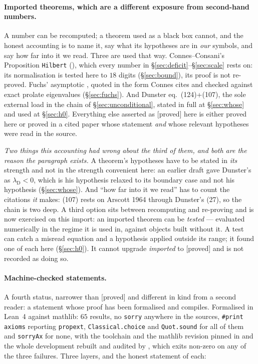 \documentclass[11pt,a4paper]{article}
\theoremstyle{plain}
\theoremstyle{definition}
\theoremstyle{remark}
\newcommand{\st}[1]{{\normalfont\sffamily\footnotesize[#1]}}
\newcommand{\proved}{\st{proved}}
\newcommand{\file}[1]{\path{#1}}
\begin{document}
\paragraph{Imported theorems, which are a different exposure from second-hand
numbers.}  A number can be recomputed; a theorem used as a black box cannot,
and the honest accounting is to name it, say what its hypotheses are in
\emph{our} symbols, and say how far into it we read.  Three are used that way.
Connes--Consani's Proposition \texttt{Hilbert} (\file{:289}), which every number
in \S\ref{sec:deficit}--\S\ref{sec:scale} rests on: its normalisation is tested
here to $18$ digits (\S\ref{sec:bound}), its proof is not re-proved.  Fuchs'
asymptotic \cite{Fuchs1964}, quoted in the form Connes cites and checked against
exact prolate eigenvalues (\S\ref{sec:fuchs}).  And Dunster
\cite{Dunster2017} eq.\ (124)+(107), the sole external load in the chain of
\S\ref{sec:unconditional}, stated in full at \S\ref{sec:whose} and used at
\S\ref{sec:h0}.  Everything else asserted as \proved{} here is either proved
here or proved in a cited paper whose statement \emph{and} whose relevant
hypotheses were read in the source.

\emph{Two things this accounting had wrong about the third of them, and both are
the reason the paragraph exists.}  A theorem's hypotheses have to be stated in
\emph{its} strength and not in the strength convenient here: an earlier draft
gave Dunster's as $\lambda_{\mathrm D}<0$, which is his hypothesis relaxed to
its boundary case and not his hypothesis (\S\ref{sec:whose}).  And ``how far into it we read'' has to
count the citations \emph{it} makes: (107) rests on Arscott 1964 through
Dunster's (27), so the chain is two deep.  A third option sits between
recomputing and re-proving and is now exercised on this import: an imported
theorem can be \emph{tested} --- evaluated numerically in the regime it is used
in, against objects built without it.  A test can catch a misread equation and
a hypothesis applied outside its range; it found one of each here
(\S\ref{sec:h0}).  It cannot upgrade \emph{imported} to \proved{} and is not
recorded as doing so.

\paragraph{Machine-checked statements.}  A fourth status, narrower than
\proved{} and different in kind from a second reader: a statement whose proof
has been formalised and compiles.  Formalised in Lean~4 against mathlib:
$65$ results, no \texttt{sorry} anywhere in the sources, \texttt{\#print axioms}
reporting \texttt{propext}, \texttt{Classical.choice} and \texttt{Quot.sound} for
all of them and \texttt{sorryAx} for none, with the toolchain and the mathlib
revision pinned in \file{lean/README.md} and the whole development rebuilt and
audited by \file{lean/scripts/check.sh}, which exits non-zero on any of the three
failures.  Three layers, and the honest statement of each:
\end{document}
